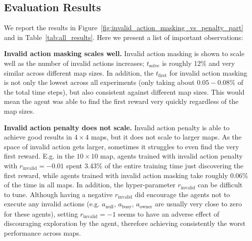 \documentclass[letterpaper]{article}
\begin{document}
\subsection{Evaluation Results}


We report the results in Figure~\ref{fig:invalid_action_masking_vs_penalty_part} and in Table~\ref{tab:all_results}. Here we present a list of important observations:

\textbf{Invalid action masking scales well. } Invalid action masking is shown to scale well as the number of invalid actions increases; $t_\text{solve}$ is roughly 12\% and very similar across different map sizes. In addition, the $t_\text{first}$ for invalid action masking is not only the lowest across all experiments (only taking about $0.05-0.08\%$ of the total time steps), but also consistent against different map sizes. This would mean the agent was able to find the first reward very quickly regardless of the map sizes.

\textbf{Invalid action penalty does not scale.} Invalid action penalty is able to achieve good results in $4\times 4$ maps, but it does not scale to larger maps. As the space of invalid action gets larger, sometimes it struggles to even find the very first reward. E.g. in the $10\times10$ map, agents trained with invalid action penalty with $r_{\text{invalid}}=-0.01$ spent 3.43\% of the entire training time just discovering the first reward, while agents trained with invalid action masking take roughly 0.06\% of the time in all maps. In addition, the hyper-parameter $r_{\text{invalid}}$ can be difficult to tune. Although having a negative $r_{\text{invalid}}$ did encourage the agents not to execute any invalid actions (e.g. $a_\text{null}$, $a_\text{busy}$, $a_\text{owner}$ are usually very close to zero for these agents), setting $r_{\text{invalid}}=-1$ seems to have an adverse effect of discouraging exploration by the agent, therefore achieving consistently the worst performance across maps.
\end{document}
